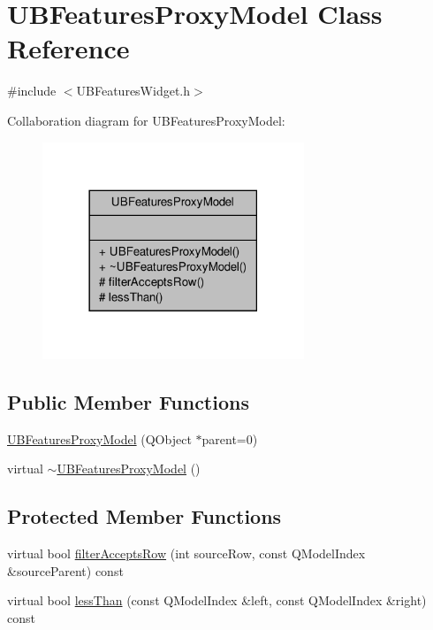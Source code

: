 \hypertarget{class_u_b_features_proxy_model}{\section{U\-B\-Features\-Proxy\-Model Class Reference}
\label{d9/d6c/class_u_b_features_proxy_model}
}


{\ttfamily \#include $<$U\-B\-Features\-Widget.\-h$>$}



Collaboration diagram for U\-B\-Features\-Proxy\-Model\-:
\nopagebreak
\begin{figure}[H]
\begin{center}
\leavevmode
\includegraphics[width=222pt]{d0/da7/class_u_b_features_proxy_model__coll__graph}
\end{center}
\end{figure}
\subsection*{Public Member Functions}
\begin{DoxyCompactItemize}
\item 
\hyperlink{class_u_b_features_proxy_model_a189646e3622ce5de902803810b7df3ce}{U\-B\-Features\-Proxy\-Model} (Q\-Object $\ast$parent=0)
\item 
virtual \hyperlink{class_u_b_features_proxy_model_a8a7eb1d864ef1d95b5af1d896cef8d86}{$\sim$\-U\-B\-Features\-Proxy\-Model} ()
\end{DoxyCompactItemize}
\subsection*{Protected Member Functions}
\begin{DoxyCompactItemize}
\item 
virtual bool \hyperlink{class_u_b_features_proxy_model_af66f43d4f0d3b5156d4445b98cf19ce2}{filter\-Accepts\-Row} (int source\-Row, const Q\-Model\-Index \&source\-Parent) const 
\item 
virtual bool \hyperlink{class_u_b_features_proxy_model_a7c0c13cd786423d0522355b9ef50b9a0}{less\-Than} (const Q\-Model\-Index \&left, const Q\-Model\-Index \&right) const 
\end{DoxyCompactItemize}


